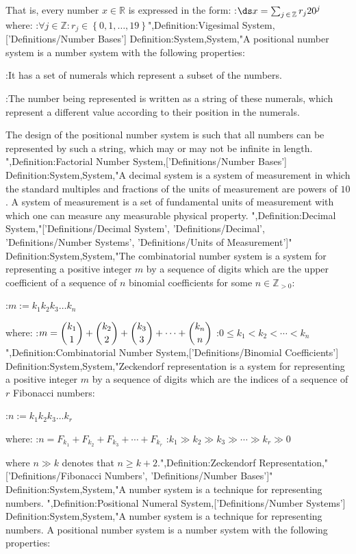 That is, every number $x \in \mathbb R$ is expressed in the form:
:$\ds x = \sum_{j \mathop \in \mathbb Z} r_j 20^j$
where:
:$\forall j \in \mathbb Z: r_j \in \left\lbrace 0, 1, \ldots, 19 \right\rbrace$",Definition:Vigesimal System,['Definitions/Number Bases']
Definition:System,System,"A positional number system is a number system with the following properties:

:It has a set of numerals which represent a subset of the numbers.

:The number being represented is written as a string of these numerals, which represent a different value according to their position in the numerals.

The design of the positional number system is such that all numbers can be represented by such a string, which may or may not be infinite in length.
",Definition:Factorial Number System,['Definitions/Number Bases']
Definition:System,System,"A decimal system is a system of measurement in which the standard multiples and fractions of the units of measurement are powers of $10$.
A system of measurement is a set of fundamental units of measurement with which one can measure any measurable physical property.
",Definition:Decimal System,"['Definitions/Decimal System', 'Definitions/Decimal', 'Definitions/Number Systems', 'Definitions/Units of Measurement']"
Definition:System,System,"The combinatorial number system is a system for representing a positive integer $m$ by a sequence of digits which are the upper coefficient of a sequence of $n$ binomial coefficients for some $n \in \mathbb Z_{>0}$:

:$m := k_1 k_2 k_3 \ldots k_n$

where:
:$m = \dbinom {k_1} 1 + \dbinom {k_2} 2 + \dbinom {k_3} 3 + \cdots + \dbinom {k_n} n$
:$0 \le k_1 < k_2 < \cdots < k_n$",Definition:Combinatorial Number System,['Definitions/Binomial Coefficients']
Definition:System,System,"Zeckendorf representation is a system for representing a positive integer $m$ by a sequence of digits which are the indices of a sequence of $r$ Fibonacci numbers:

:$n := k_1 k_2 k_3 \ldots k_r$

where:
:$n = F_{k_1} + F_{k_2} + F_{k_3} + \cdots + F_{k_r}$
:$k_1 \gg k_2 \gg k_3 \gg \cdots \gg k_r \gg 0$

where $n \gg k$ denotes that $n \ge k + 2$.",Definition:Zeckendorf Representation,"['Definitions/Fibonacci Numbers', 'Definitions/Number Bases']"
Definition:System,System,"A number system is a technique for representing numbers.
",Definition:Positional Numeral System,['Definitions/Number Systems']
Definition:System,System,"A number system is a technique for representing numbers.
A positional number system is a number system with the following properties:

